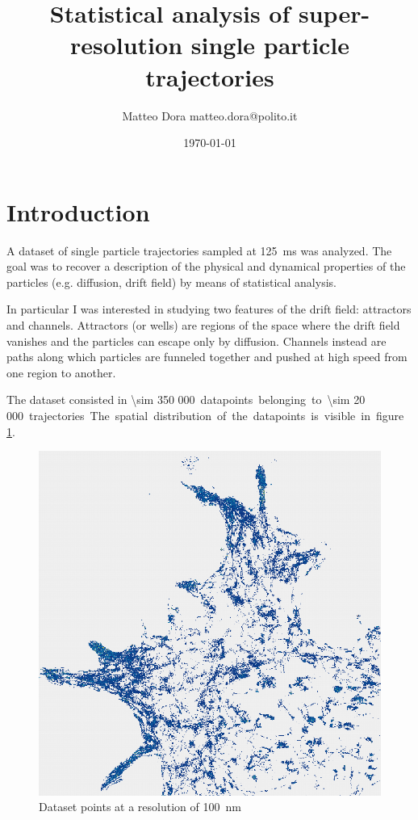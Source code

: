 \documentclass[a4paper]{article}
\title{Statistical analysis of super-resolution single particle trajectories}
\author{Matteo Dora \newline\newline \small{\mbox{matteo.dora@polito.it}}}
\date{\today}
\begin{document}
\maketitle

\section{Introduction}

A dataset of single particle trajectories sampled at \SI{125}{ms} was analyzed. The goal was to recover a description of the physical and dynamical properties of the particles (e.g. diffusion, drift field) by means of statistical analysis.

In particular I was interested in studying two features of the drift field: attractors and channels. Attractors (or wells) are regions of the space where the drift field vanishes and the particles can escape only by diffusion. Channels instead are paths along which particles are funneled together and pushed at high speed from one region to another.

The dataset consisted in \SI{\sim 350 000} datapoints belonging to \SI{\sim 20 000} trajectories. The spatial distribution of the datapoints is visible in figure \ref{fig:datapoints}.

\begin{figure}[h]
  \includegraphics[width=\linewidth]{img/01_datapoints.png}
  \caption{Dataset points at a resolution of \SI{100}{nm}}
  \label{fig:datapoints}
\end{figure}
\end{document}
